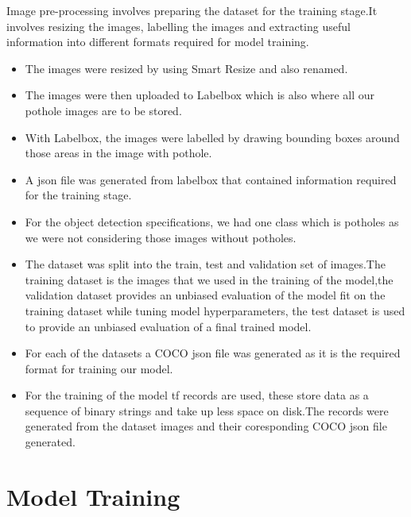 \documentclass[12pt]{report}
\begin{document}
Image pre-processing involves preparing the dataset for the training stage.It involves resizing the images, labelling the images and  extracting useful information into different formats required for model training.
\begin{itemize}[topsep=0pt]

\item The images were resized by using Smart Resize and also renamed.

\item The images were then uploaded to Labelbox which is also where all our pothole images are to be stored.%

\item  With Labelbox, the images were labelled by drawing bounding boxes around those areas in the image with pothole.

\item A json file was generated from labelbox that contained information required for the training stage.

\item For the object detection specifications, we had one class which is potholes as we were not considering those images without potholes.

\item The dataset was split into the train, test and validation set of images.The training dataset is the images that we used in the training of the model,the validation dataset provides an unbiased evaluation of the model fit on the training dataset while tuning model hyperparameters, the test dataset is used to provide an unbiased evaluation of a final trained model.

\item For each of the datasets a COCO json file was generated as it is the required format for training our model.%

\item For the training of the model tf records are used, these store data as a sequence of binary strings and take up less space on disk.The records were generated from the dataset images and their coresponding COCO json file generated.

\end{itemize}

\section{Model Training}
\end{document}
